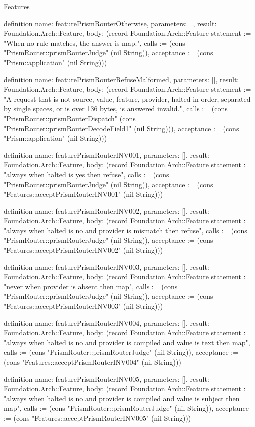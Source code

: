 \begin{lexlean}{Features}
\begin{semanticmodule}
definition{
  name: featurePrismRouterOtherwise,
  parameters: [],
  result: Foundation.Arch::Feature,
  body: (record Foundation.Arch::Feature {statement := "When no rule matches, the answer is map.", calls := (cons "PrismRouter::prismRouterJudge" (nil String)), acceptance := (cons "Prism::application" (nil String))})
}

definition{
  name: featurePrismRouterRefuseMalformed,
  parameters: [],
  result: Foundation.Arch::Feature,
  body: (record Foundation.Arch::Feature {statement := "A request that is not source, value, feature, provider, halted in order, separated by single spaces, or is over 136 bytes, is answered invalid.", calls := (cons "PrismRouter::prismRouterDispatch" (cons "PrismRouter::prismRouterDecodeField1" (nil String))), acceptance := (cons "Prism::application" (nil String))})
}

definition{
  name: featurePrismRouterINV001,
  parameters: [],
  result: Foundation.Arch::Feature,
  body: (record Foundation.Arch::Feature {statement := "always when halted is yes then refuse", calls := (cons "PrismRouter::prismRouterJudge" (nil String)), acceptance := (cons "Features::acceptPrismRouterINV001" (nil String))})
}

definition{
  name: featurePrismRouterINV002,
  parameters: [],
  result: Foundation.Arch::Feature,
  body: (record Foundation.Arch::Feature {statement := "always when halted is no and provider is mismatch then refuse", calls := (cons "PrismRouter::prismRouterJudge" (nil String)), acceptance := (cons "Features::acceptPrismRouterINV002" (nil String))})
}

definition{
  name: featurePrismRouterINV003,
  parameters: [],
  result: Foundation.Arch::Feature,
  body: (record Foundation.Arch::Feature {statement := "never when provider is absent then map", calls := (cons "PrismRouter::prismRouterJudge" (nil String)), acceptance := (cons "Features::acceptPrismRouterINV003" (nil String))})
}

definition{
  name: featurePrismRouterINV004,
  parameters: [],
  result: Foundation.Arch::Feature,
  body: (record Foundation.Arch::Feature {statement := "always when halted is no and provider is compiled and value is text then map", calls := (cons "PrismRouter::prismRouterJudge" (nil String)), acceptance := (cons "Features::acceptPrismRouterINV004" (nil String))})
}

definition{
  name: featurePrismRouterINV005,
  parameters: [],
  result: Foundation.Arch::Feature,
  body: (record Foundation.Arch::Feature {statement := "always when halted is no and provider is compiled and value is subject then map", calls := (cons "PrismRouter::prismRouterJudge" (nil String)), acceptance := (cons "Features::acceptPrismRouterINV005" (nil String))})
}


\end{semanticmodule}
\end{lexlean}
